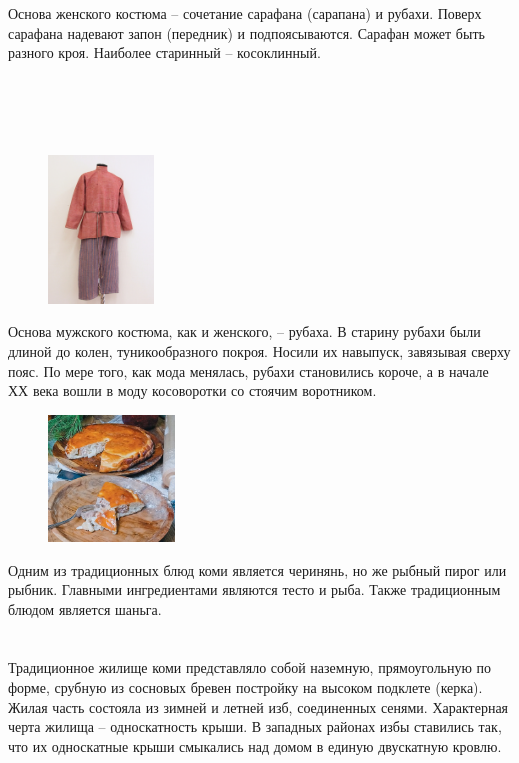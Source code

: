 \documentclass[a4paper,14pt]{extarticle}
\begin{document}
	Основа женского костюма – сочетание сарафана (сарапана) и рубахи. Поверх сарафана надевают запон (передник) и подпоясываются. Сарафан может быть разного кроя. Наиболее старинный – косоклинный.\\\\\\\\\\
	
	\pagebreak
	\begin{figure}
		\centering
		\includegraphics[width=0.25\textwidth]{images/m}
	\end{figure}
	
	Основа мужского костюма, как и женского, – рубаха. В старину рубахи были длиной до колен, туникообразного покроя. Носили их навыпуск, завязывая сверху пояс. По мере того, как мода менялась, рубахи становились короче, а в начале ХХ века вошли в моду косоворотки со стоячим воротником.\\
	
	\begin{figure}
		\centering
		\includegraphics[width=0.3\textwidth]{images/ch}
	\end{figure}
	
	Одним из традиционных блюд коми является черинянь, но же рыбный пирог или рыбник. Главными ингредиентами являются тесто и рыба. Также традиционным блюдом является шаньга.\\\\\\
	
	Традиционное жилище коми представляло собой наземную, прямоугольную по форме, срубную из сосновых бревен постройку на высоком подклете (керка). Жилая часть состояла из зимней и летней изб, соединенных сенями. Характерная черта жилища -- односкатность крыши. В западных районах избы ставились так, что их односкатные крыши смыкались над домом в единую двускатную кровлю.
	
\end{document}
